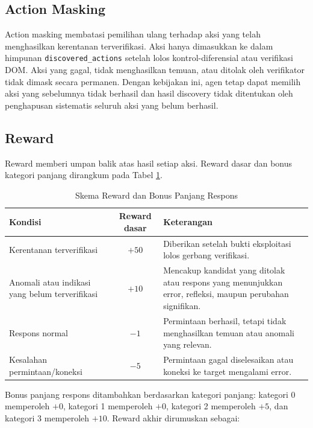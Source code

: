 \subsection{Action Masking}

Action masking membatasi pemilihan ulang terhadap aksi yang telah menghasilkan kerentanan terverifikasi. Aksi hanya dimasukkan ke dalam himpunan \texttt{discovered\_actions} setelah lolos kontrol-diferensial atau verifikasi DOM. Aksi yang gagal, tidak menghasilkan temuan, atau ditolak oleh verifikator tidak dimask secara permanen. Dengan kebijakan ini, agen tetap dapat memilih aksi yang sebelumnya tidak berhasil dan hasil discovery tidak ditentukan oleh penghapusan sistematis seluruh aksi yang belum berhasil.

\subsection{Reward}

Reward memberi umpan balik atas hasil setiap aksi. Reward dasar dan bonus kategori panjang dirangkum pada Tabel \ref{tab:reward_scheme}.

\begin{table}[H]
\centering
\caption{Skema Reward dan Bonus Panjang Respons}
\label{tab:reward_scheme}
\begin{tabular}{|p{5.1cm}|c|p{6.6cm}|}
\hline
\textbf{Kondisi} & \textbf{Reward dasar} & \textbf{Keterangan} \\ \hline
Kerentanan terverifikasi & \(+50\) & Diberikan setelah bukti eksploitasi lolos gerbang verifikasi. \\ \hline
Anomali atau indikasi yang belum terverifikasi & \(+10\) & Mencakup kandidat yang ditolak atau respons yang menunjukkan error, refleksi, maupun perubahan signifikan. \\ \hline
Respons normal & \(-1\) & Permintaan berhasil, tetapi tidak menghasilkan temuan atau anomali yang relevan. \\ \hline
Kesalahan permintaan/koneksi & \(-5\) & Permintaan gagal diselesaikan atau koneksi ke target mengalami error. \\ \hline
\end{tabular}
\end{table}

Bonus panjang respons ditambahkan berdasarkan kategori panjang: kategori 0 memperoleh \(+0\), kategori 1 memperoleh \(+0\), kategori 2 memperoleh \(+5\), dan kategori 3 memperoleh \(+10\). Reward akhir dirumuskan sebagai:

